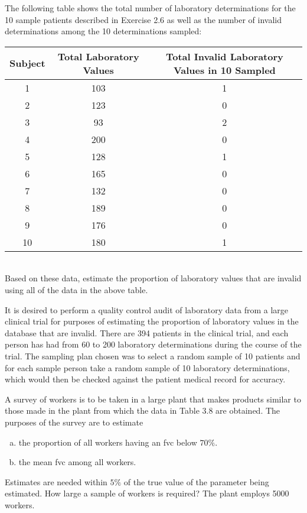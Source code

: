 \documentclass[12pt]{article}
\begin{document}
    \begin{exercise}[Levy-2.8]
        The following table shows the total number of laboratory determinations for the 10 sample patients described in Exercise 2.6 as well as the number of invalid determinations among the 10 determinations sampled: \\[0.5em]
        \begin{tabular}{ccc}
            \hline Subject & Total Laboratory Values & Total Invalid Laboratory Values in 10 Sampled \\
            \hline 1 & 103 & 1 \\
            2 & 123 & 0 \\
            3 & 93 & 2 \\
            4 & 200 & 0 \\
            5 & 128 & 1 \\
            6 & 165 & 0 \\
            7 & 132 & 0 \\
            8 & 189 & 0 \\
            9 & 176 & 0 \\
            10 & 180 & 1 \\
            \hline
        \end{tabular}
        \\[0.5em]
        Based on these data, estimate the proportion of laboratory values that are invalid using all of the data in the above table. 
    \end{exercise}
    \begin{exercise}[Exercise 2.6]
        It is desired to perform a quality control audit of laboratory data from a large clinical trial for purposes of estimating the proportion of laboratory values in the database that are invalid. There are 394 patients in the clinical trial, and each person has had from 60 to 200 laboratory determinations during the course of the trial. The sampling plan chosen was to select a random sample of 10 patients and for each sample person take a random sample of 10 laboratory determinations, which would then be checked against the patient medical record for accuracy. 
    \end{exercise}

    \begin{exercise}[Levy-3.6]
        A survey of workers is to be taken in a large plant that makes products similar to those made in the plant from which the data in Table 3.8 are obtained. The purposes of the survey are to estimate 
        \begin{enumerate}[(a)]
            \item the proportion of all workers having an fvc below $70\%$. 
            \item the mean fvc among all workers. 
        \end{enumerate}
        Estimates are needed within $5\%$ of the true value of the parameter being estimated. How large a sample of workers is required? The plant employs 5000 workers.
    \end{exercise}
\end{document}
